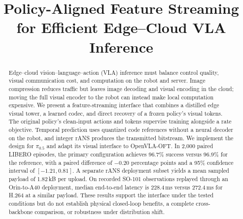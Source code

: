 \documentclass[sigconf,10pt]{acmart}
\begin{document}
\title{Policy-Aligned Feature Streaming for Efficient Edge--Cloud VLA Inference}
\begin{abstract}
Edge--cloud vision--language--action (VLA) inference must balance control
quality, visual communication cost, and computation on the robot and
server. Image compression reduces traffic but leaves image decoding and
visual encoding in the cloud; moving the full visual encoder to the robot
can instead make local computation expensive. We present a
feature-streaming interface that combines a distilled edge visual tower,
a learned codec, and direct recovery of a frozen policy's visual tokens.
The original policy's clean-input actions and tokens supervise training
alongside a rate objective. Temporal prediction uses quantized code
references without a neural decoder on the robot, and integer rANS
produces the transmitted bitstream.
We implement the design for $\pi_{0.5}$ and adapt its visual interface to
OpenVLA-OFT. In 2,000 paired LIBERO episodes, the primary configuration
achieves 96.7\% success versus 96.9\% for the reference, with a paired
difference of $-0.20$ percentage points and a 95\% confidence interval of
$[-1.21,0.81]$. A separate rANS deployment subset yields a mean sampled
payload of 1.82\,kB per upload. On recorded SO-101 observations replayed
through an Orin-to-A40 deployment, median end-to-end latency is
228.4\,ms versus 272.4\,ms for H.264 at a similar payload.
These results support the interface under the tested conditions but do
not establish physical closed-loop benefits, a complete cross-backbone
comparison, or robustness under distribution shift.
\end{abstract}
\maketitle










\appendix

\end{document}
